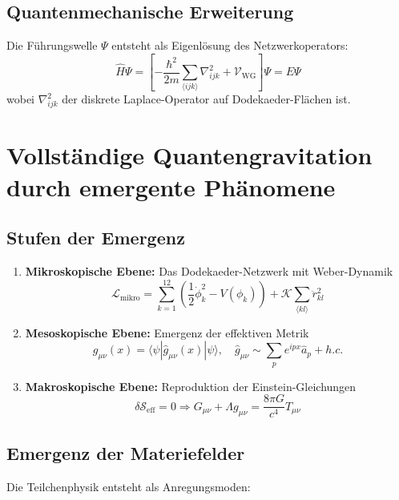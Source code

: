 \subsection{Quantenmechanische Erweiterung}
Die Führungswelle $\Psi$ entsteht als Eigenlösung des Netzwerkoperators:
\begin{equation}
\hat{H} \Psi = \left[ -\frac{\hbar^2}{2m} \sum_{\langle ijk \rangle} \nabla_{ijk}^2 + \mathcal{V}_{\text{WG}} \right] \Psi = E \Psi
\end{equation}
wobei $\nabla_{ijk}^2$ der diskrete Laplace-Operator auf Dodekaeder-Flächen ist.

\section{Vollständige Quantengravitation durch emergente Phänomene}
\subsection{Stufen der Emergenz}

\begin{enumerate}
    \item \textbf{Mikroskopische Ebene:} Das Dodekaeder-Netzwerk mit Weber-Dynamik
    \begin{equation}
        \mathcal{L}_{\text{mikro}} = \sum_{k=1}^{12} \left( \frac{1}{2}\dot{\phi}_k^2 - V(\phi_k) \right) + \mathcal{K} \sum_{\langle kl \rangle} \ddot{r}_{kl}^2
    \end{equation}
    
    \item \textbf{Mesoskopische Ebene:} Emergenz der effektiven Metrik
    \begin{equation}
        g_{\mu\nu}(x) = \langle \psi|\hat{g}_{\mu\nu}(x)|\psi \rangle, \quad \hat{g}_{\mu\nu} \sim \sum_p e^{ipx}\hat{a}_p + h.c.
    \end{equation}
    
    \item \textbf{Makroskopische Ebene:} Reproduktion der Einstein-Gleichungen
    \begin{equation}
        \delta \mathcal{S}_{\text{eff}} = 0 \Rightarrow G_{\mu\nu} + \Lambda g_{\mu\nu} = \frac{8\pi G}{c^4} T_{\mu\nu}
    \end{equation}
\end{enumerate}

\subsection{Emergenz der Materiefelder}
Die Teilchenphysik entsteht als Anregungsmoden:

